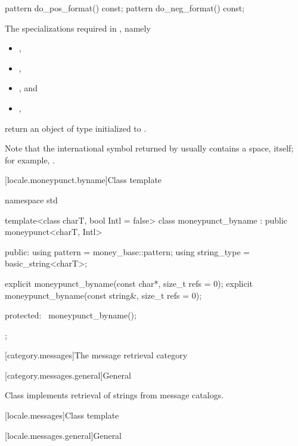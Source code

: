 %
%
\begin{itemdecl}
pattern do_pos_format() const;
pattern do_neg_format() const;
\end{itemdecl}

\begin{itemdescr}
\pnum
\returns
The specializations required in , namely
\begin{itemize}
\item {},
\item {},
\item {}, and
\item {},
\end{itemize}
return an object of type 
initialized to .
\begin{footnote}
Note that the international symbol returned by 
usually contains a space, itself;
for example, .
\end{footnote}
\end{itemdescr}

[locale.moneypunct.byname]{Class template }

%
\begin{codeblock}
namespace std {
  template<class charT, bool Intl = false>
    class moneypunct_byname : public moneypunct<charT, Intl> {
    public:
      using pattern     = money_base::pattern;
      using string_type = basic_string<charT>;

      explicit moneypunct_byname(const char*, size_t refs = 0);
      explicit moneypunct_byname(const string&, size_t refs = 0);

    protected:
      ~moneypunct_byname();
    };
}
\end{codeblock}

[category.messages]{The message retrieval category}

[category.messages.general]{General}

\pnum
Class 
implements retrieval of strings from message catalogs.

[locale.messages]{Class template }

[locale.messages.general]{General}

